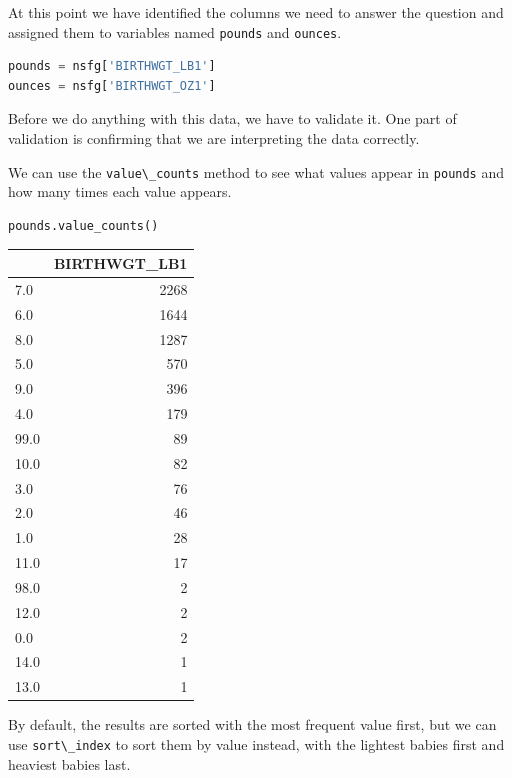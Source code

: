 At this point we have identified the columns we need to answer the
question and assigned them to variables named
\passthrough{\lstinline!pounds!} and \passthrough{\lstinline!ounces!}.

\begin{lstlisting}[language=Python]
pounds = nsfg['BIRTHWGT_LB1']
ounces = nsfg['BIRTHWGT_OZ1']
\end{lstlisting}

Before we do anything with this data, we have to validate it. One part
of validation is confirming that we are interpreting the data correctly.

We can use the \passthrough{\lstinline!value\_counts!} method to see
what values appear in \passthrough{\lstinline!pounds!} and how many
times each value appears.

\begin{lstlisting}[language=Python]
pounds.value_counts()
\end{lstlisting}

\begin{tabular}{lr}
\toprule
{} &  BIRTHWGT\_LB1 \\
\midrule
7.0  &          2268 \\
6.0  &          1644 \\
8.0  &          1287 \\
5.0  &           570 \\
9.0  &           396 \\
4.0  &           179 \\
99.0 &            89 \\
10.0 &            82 \\
3.0  &            76 \\
2.0  &            46 \\
1.0  &            28 \\
11.0 &            17 \\
98.0 &             2 \\
12.0 &             2 \\
0.0  &             2 \\
14.0 &             1 \\
13.0 &             1 \\
\bottomrule
\end{tabular}

By default, the results are sorted with the most frequent value first,
but we can use \passthrough{\lstinline!sort\_index!} to sort them by
value instead, with the lightest babies first and heaviest babies last.


